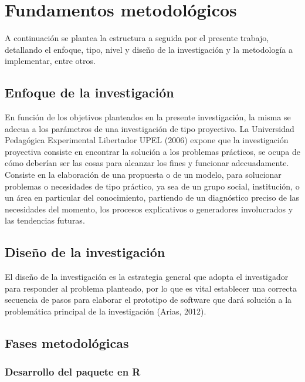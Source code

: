 \chapter{Fundamentos metodol\'ogicos}

	A continuaci\'on se plantea la estructura a seguida por el presente trabajo, detallando el enfoque, tipo, nivel y dise\~no de la investigaci\'on y la metodolog\'ia a implementar, entre otros.
	
\section{Enfoque de la investigaci\'on}
	
	En función de los objetivos planteados en la presente investigación, la misma se adecua a los parámetros de una investigación de tipo proyectivo. La Universidad Pedagógica Experimental Libertador UPEL (2006) expone que la investigación proyectiva consiste en encontrar la solución a los problemas prácticos, se ocupa de cómo deberían ser las cosas para alcanzar los fines y funcionar adecuadamente. Consiste en la elaboración de una propuesta o de un modelo, para solucionar problemas o necesidades de tipo práctico, ya sea de un grupo social, institución, o un área en particular del conocimiento, partiendo de un diagnóstico preciso de las necesidades del momento, los procesos explicativos o generadores involucrados y las tendencias futuras.\\
	
	
\section{Dise\~no de la investigaci\'on}
	
El diseño de la investigación es la estrategia general que adopta el investigador para responder al problema planteado,  por lo que es vital establecer una correcta secuencia de pasos para elaborar el prototipo de software que dar\'a solución a la problem\'atica principal de la investigación (Arias, 2012).\\

\section{Fases metodológicas}

\subsection{Desarrollo del paquete en R}


